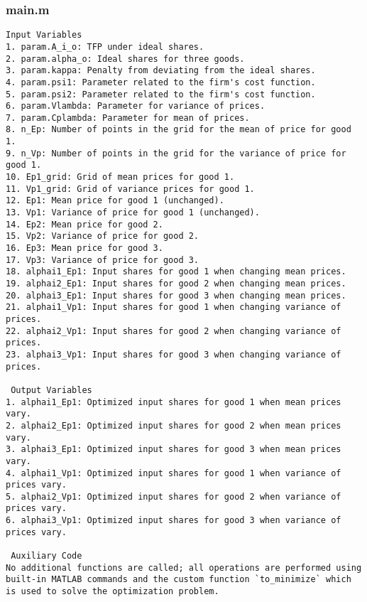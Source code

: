 \documentclass[11pt]{article}
\theoremstyle{definition}
\newcommand{\codepath}{F:/12004835/replication_package_final/replication_package_final}
\begin{document}
	\subsubsection{main.m}
	\begin{lstlisting}[style=Matlab]
 Input Variables
1. param.A_i_o: TFP under ideal shares.
2. param.alpha_o: Ideal shares for three goods.
3. param.kappa: Penalty from deviating from the ideal shares.
4. param.psi1: Parameter related to the firm's cost function.
5. param.psi2: Parameter related to the firm's cost function.
6. param.Vlambda: Parameter for variance of prices.
7. param.Cplambda: Parameter for mean of prices.
8. n_Ep: Number of points in the grid for the mean of price for good 1.
9. n_Vp: Number of points in the grid for the variance of price for good 1.
10. Ep1_grid: Grid of mean prices for good 1.
11. Vp1_grid: Grid of variance prices for good 1.
12. Ep1: Mean price for good 1 (unchanged).
13. Vp1: Variance of price for good 1 (unchanged).
14. Ep2: Mean price for good 2.
15. Vp2: Variance of price for good 2.
16. Ep3: Mean price for good 3.
17. Vp3: Variance of price for good 3.
18. alphai1_Ep1: Input shares for good 1 when changing mean prices.
19. alphai2_Ep1: Input shares for good 2 when changing mean prices.
20. alphai3_Ep1: Input shares for good 3 when changing mean prices.
21. alphai1_Vp1: Input shares for good 1 when changing variance of prices.
22. alphai2_Vp1: Input shares for good 2 when changing variance of prices.
23. alphai3_Vp1: Input shares for good 3 when changing variance of prices.

 Output Variables
1. alphai1_Ep1: Optimized input shares for good 1 when mean prices vary.
2. alphai2_Ep1: Optimized input shares for good 2 when mean prices vary.
3. alphai3_Ep1: Optimized input shares for good 3 when mean prices vary.
4. alphai1_Vp1: Optimized input shares for good 1 when variance of prices vary.
5. alphai2_Vp1: Optimized input shares for good 2 when variance of prices vary.
6. alphai3_Vp1: Optimized input shares for good 3 when variance of prices vary.

 Auxiliary Code
No additional functions are called; all operations are performed using built-in MATLAB commands and the custom function `to_minimize` which is used to solve the optimization problem.
	\end{lstlisting}
	
	
\end{document}
